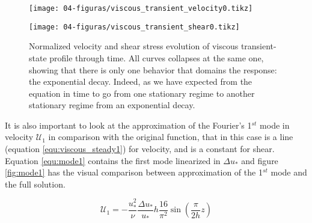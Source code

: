     \begin{figure}[H]
        \centering
        \parbox{1\textwidth}{
            \centering
            \texttt{[image: 04-figuras/viscous\_transient\_velocity0.tikz]}
            \label{fig:viscous_transient_velocity0}
        }
        \parbox{1\textwidth}{
            \centering
            \texttt{[image: 04-figuras/viscous\_transient\_shear0.tikz]}
            \label{fig:viscous_transient_shear0}
        }
        \caption[Normalized profiles for viscous fluid.]{Normalized velocity and shear stress evolution of viscous transient-state profile through time. All curves collapses at the same one, showing that there is only one behavior that domains the response: the exponential decay. Indeed, as we have expected from the equation in time to go from one stationary regime to another stationary regime from an exponential decay.}
        \label{fig:viscous_transient0}
    \end{figure}

    It is also important to look at the approximation of the Fourier's 1$^{st}$ mode in velocity $\mathcal{U}_1$ in comparison with the original function, that in this case is a line (equation \ref{equ:viscous_steady1}) for velocity, and is a constant for shear. Equation \ref{equ:mode1} contains the first mode linearized in $\Delta u_*$ and figure \ref{fig:mode1} has the visual comparison between approximation of the 1$^{st}$ mode and the full solution.

    \begin{equation}
        \mathcal{U}_1 = -\frac{u_*^2}{\nu}\frac{\Delta u_*}{u_*}h\frac{16}{\pi^2}\sin\left(\frac{\pi}{2h}z\right)
        \label{equ:mode1}
    \end{equation}


